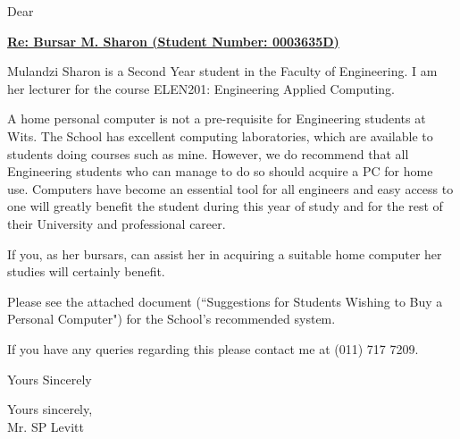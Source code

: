 \documentclass[11pt]{article}
\begin{document}
\acct{}
\faxno{}
\date{\today}

\makefax
\large 

\vspace{-1cm} %

Dear 

\centerline{\bf \underline{Re: Bursar M. Sharon (Student Number: 0003635D)} }
Mulandzi Sharon is a Second Year student in the Faculty of Engineering. I am her lecturer for the course ELEN201: Engineering Applied Computing. 

A home personal computer is not a pre-requisite for Engineering students at Wits. The School has excellent computing laboratories, which are available to students doing courses such as mine. However, we do recommend that all Engineering students who can manage to do so should acquire a PC for home use. Computers have become an essential tool for all engineers and easy access to one will greatly benefit the student during this year of study and for the rest of their University and professional career.

If you, as her bursars, can assist her in acquiring a suitable home computer her studies will certainly benefit.

Please see the attached document (``Suggestions for Students Wishing to Buy a Personal Computer") for the School's recommended system.

If you have any queries regarding this please contact me at (011) 717 7209.


Yours Sincerely


\vspace{7 mm}
Yours sincerely, \\  

Mr. SP Levitt 
\end{document}
